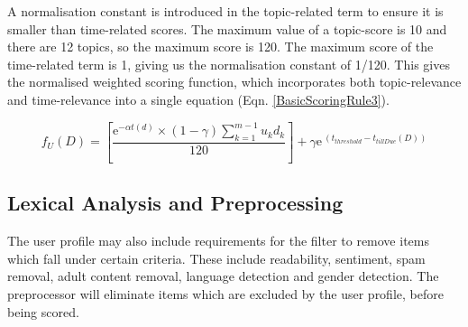 A normalisation constant is introduced in the topic-related term to ensure it is smaller than time-related scores. The maximum value of a topic-score is 10 and there are 12 topics, so the maximum score is 120. The maximum score of the time-related term is 1, giving us the normalisation constant of 1/120.
This gives the normalised weighted scoring function, which incorporates both topic-relevance and time-relevance into a single equation (Eqn. \ref{BasicScoringRule3}). 

\begin{equation}\label{BasicScoringRule3}
	f_U (D) = \left[\frac{{\mathrm{e}}^{-\alpha t(d)} \times (1-\gamma) \sum_{k=1}^{m-1} u_kd_k}{120} \right] + \gamma{\mathrm{e}}^{\ (t_{threshold}-t_{tillDue}(D))}
\end{equation}

\subsection{Lexical Analysis and Preprocessing}

The user profile may also include requirements for the filter to remove items which fall under certain criteria. These include readability, sentiment, spam removal, adult content removal, language detection and gender detection. The preprocessor will eliminate items which are excluded by the user profile, before being scored. 
